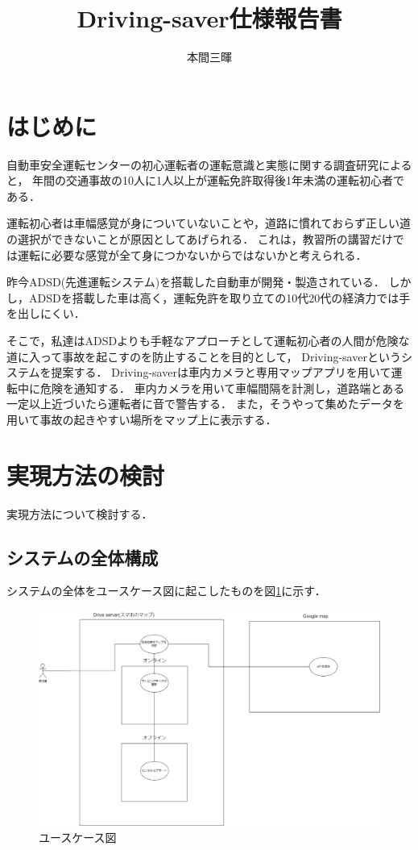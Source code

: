 \documentclass[titlepage,a4paper]{jsarticle}
\title{Driving-saver仕様報告書}
\author{本間三暉}
\begin{document}
\maketitle
\section{はじめに}
自動車安全運転センターの初心運転者の運転意識と実態に関する調査研究\cite{自動車}によると，
年間の交通事故の10人に1人以上が運転免許取得後1年未満の運転初心者である．

運転初心者は車幅感覚が身についていないことや，道路に慣れておらず正しい道の選択ができないことが原因としてあげられる．
これは，教習所の講習だけでは運転に必要な感覚が全て身につかないからではないかと考えられる．

昨今ADSD(先進運転システム)を搭載した自動車が開発・製造されている．
しかし，ADSDを搭載した車は高く，運転免許を取り立ての10代20代の経済力では手を出しにくい．

そこで，私達はADSDよりも手軽なアプローチとして運転初心者の人間が危険な道に入って事故を起こすのを防止することを目的として，
Driving-saverというシステムを提案する．
Driving-saverは車内カメラと専用マップアプリを用いて運転中に危険を通知する．
車内カメラを用いて車幅間隔を計測し，道路端とある一定以上近づいたら運転者に音で警告する．
また，そうやって集めたデータを用いて事故の起きやすい場所をマップ上に表示する．
\section{実現方法の検討}
実現方法について検討する．
\subsection{システムの全体構成}
システムの全体をユースケース図に起こしたものを図\ref{ユースケース図}に示す．

\begin{figure}[H]
  \centering
  \includegraphics[width=\textwidth]{img/usecase.drawio.png}
  \caption{ユースケース図}
  \label{ユースケース図}
\end{figure}
\end{document}
